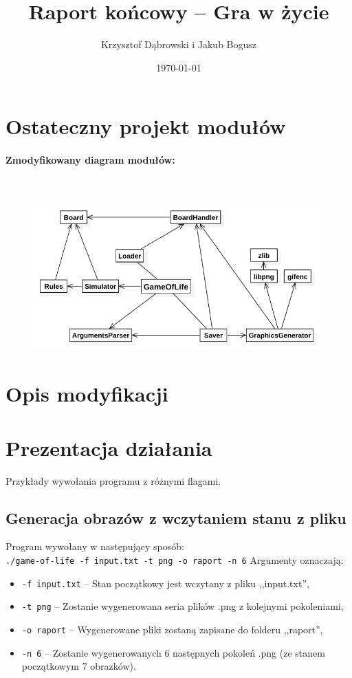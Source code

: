 \documentclass{mwart}
\title{Raport końcowy -- Gra w życie}
\author{Krzysztof Dąbrowski i Jakub Bogusz}
\date{\today}
\begin{document}
\maketitle{}

\tableofcontents{}

\section{Ostateczny projekt modułów}
\paragraph{Zmodyfikowany diagram modułów:}\mbox{}\\
\begin{figure}[H]
	\centering
	\def\svgwidth{\columnwidth}
	\includegraphics[width=13cm]{diagram_modulow.png}
\end{figure}



\section{Opis modyfikacji}

\section{Prezentacja działania}
Przykłady wywołania programu z różnymi flagami.

\subsection{Generacja obrazów z wczytaniem stanu z pliku}
Program wywołany w następujący sposób: \\
\texttt{./game-of-life -f input.txt -t png -o raport -n 6}
Argumenty oznaczają:
\begin{itemize}
\item \texttt{-f input.txt} -- Stan początkowy jest wczytany z pliku ,,input.txt'',
\item \texttt{-t png} -- Zostanie wygenerowana seria plików .png z kolejnymi pokoleniami,
\item \texttt{-o raport} -- Wygenerowane pliki zostaną zapisane do folderu ,,raport'',
\item \texttt{-n 6} -- Zostanie wygenerowanych 6 następnych pokoleń .png (ze stanem początkowym 7 obrazków).
\end{itemize}
\end{document}
